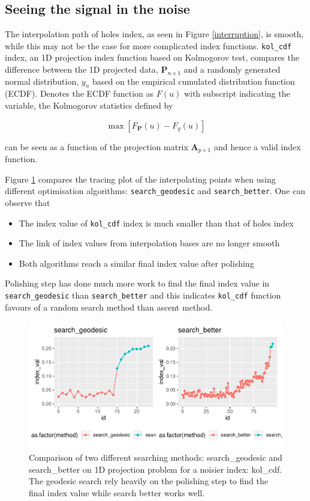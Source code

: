 \documentclass[12pt]{article}
\providecommand{\tightlist}{%
  \setlength{\itemsep}{0pt}\setlength{\parskip}{0pt}}
\begin{document}
\hypertarget{seeing-the-signal-in-the-noise}{%
\subsection{Seeing the signal in the noise}\label{seeing-the-signal-in-the-noise}}

The interpolation path of holes index, as seen in Figure \ref{interruption}, is smooth, while this may not be the case for more complicated index functions. \texttt{kol\_cdf} index, an 1D projection index function based on Kolmogorov test, compares the difference between the 1D projected data, \(\mathbf{P}_{n \times 1}\) and a randomly generated normal distribution, \(y_n\) based on the empirical cumulated distribution function (ECDF). Denotes the ECDF function as \(F(u)\) with subscript indicating the variable, the Kolmogorov statistics defined by

\[\max \left[F_{\mathbf{P}}(u) - F_{y}(u)\right]\]

can be seen as a function of the projection matrix \(\mathbf{A}_{p \times 1}\) and hence a valid index function.

Figure \ref{kol-cdf} compares the tracing plot of the interpolating points when using different optimisation algorithms: \texttt{search\_geodesic} and \texttt{search\_better}. One can observe that

\begin{itemize}
\tightlist
\item
  The index value of \texttt{kol\_cdf} index is much smaller than that of holes index
\item
  The link of index values from interpolation bases are no longer smooth
\item
  Both algorithms reach a similar final index value after polishing
\end{itemize}

Polishing step has done much more work to find the final index value in \texttt{search\_geodesic} than \texttt{search\_better} and this indicates \texttt{kol\_cdf} function favours of a random search method than ascent method.

\begin{figure}
\centering
\includegraphics{paper_files/figure-latex/kol-cdf-1.pdf}
\caption{\label{fig:kol-cdf}\label{kol-cdf}Comparison of two different searching methods: search\_geodesic and search\_better on 1D projection problem for a noisier index: kol\_cdf. The geodesic search rely heavily on the polishing step to find the final index value while search better works well.}
\end{figure}
\end{document}
